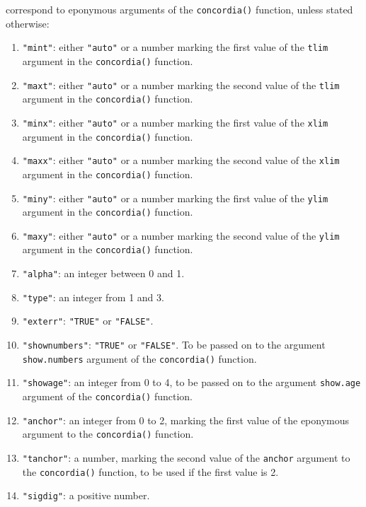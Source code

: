 \begin{refsection}
\begin{enumerate}[leftmargin=\parindent,align=left,
      labelwidth=\parindent,label*=2.\arabic*.]
    correspond to eponymous arguments of the \texttt{concordia()}
    function, unless stated otherwise:
  \begin{enumerate}[leftmargin=\parindent,align=left,
      labelwidth=\parindent,label*=\arabic*.]
    \item{\tt "mint"}: either \texttt{"auto"} or a number marking the
      first value of the \texttt{tlim} argument in the
      \texttt{concordia()} function.
    \item{\tt "maxt"}: either \texttt{"auto"} or a number marking the
      second value of the \texttt{tlim} argument in the
      \texttt{concordia()} function.
    \item{\tt "minx"}: either \texttt{"auto"} or a number marking the
      first value of the \texttt{xlim} argument in the
      \texttt{concordia()} function.
    \item{\tt "maxx"}: either \texttt{"auto"} or a number marking the
      second value of the \texttt{xlim} argument in the
      \texttt{concordia()} function.
    \item{\tt "miny"}: either \texttt{"auto"} or a number marking the
      first value of the \texttt{ylim} argument in the
      \texttt{concordia()} function.
    \item{\tt "maxy"}: either \texttt{"auto"} or a number marking the
      second value of the \texttt{ylim} argument in the
      \texttt{concordia()} function.
    \item{\tt "alpha"}: an integer between 0 and 1.
    \item{\tt "type"}: an integer from 1 and 3.
    \item{\tt "exterr"}: \texttt{"TRUE"} or \texttt{"FALSE"}.
    \item{\tt "shownumbers"}: \texttt{"TRUE"} or \texttt{"FALSE"}. To
      be passed on to the argument \texttt{show.numbers} argument of
      the \texttt{concordia()} function.
    \item{\tt "showage"}: an integer from 0 to 4, to be passed on to the
      argument \texttt{show.age} argument of the \texttt{concordia()}
      function.
    \item{\tt "anchor"}: an integer from 0 to 2, marking the first value
      of the eponymous argument to the \texttt{concordia()} function.
    \item{\tt "tanchor"}: a number, marking the second value of the
      \texttt{anchor} argument to the \texttt{concordia()} function,
      to be used if the first value is 2.
    \item{\tt "sigdig"}: a positive number.

\end{enumerate}
\end{enumerate}
\end{refsection}
